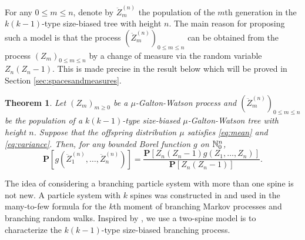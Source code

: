 \documentclass[12pt]{amsart}
\newtheorem{thm}{Theorem}[section]
\numberwithin{equation}{section}
\newcommand{\prob}{\mathbf P}
\newcommand{\expr}[1]{\left( #1 \right)}
\newcommand{\brac}[1]{\left[ #1 \right]}
\begin{document}
	For any $0\le m \le n$, denote by $\ddot Z_m^{(n)}$ the population of the $m$th generation in the $k(k-1)$-type size-biased tree with height $n$. 
	The main reason for proposing such a model is that the process $(\ddot Z_m^{(n)})_{0\le m\le n}$ can be obtained from the process $(Z_m)_{0\le m\le n}$ by a change of measure via the random variable $Z_n(Z_n-1)$. 
	This is made precise in the result below which will be proved in Section \ref{sec:spacesandmeasures}.
\begin{thm}
\label{thm:changeofmeasure}
	Let $(Z_m)_{m\ge 0}$ be a $\mu$-Galton-Watson process and 
	$(\ddot Z_m^{(n)})_{0\le m\le n}$ 
	be the population of a $k(k-1)$-type size-biased $\mu$-Galton-Watson tree with height $n$. 
	Suppose that the offspring distribution $\mu$ satisfies \eqref{eq:mean} and \eqref{eq:variance}. Then, for any bounded Borel function $g$ on $\mathbb N^{n}_0$,
\begin{equation*}
		\prob\brac{g\expr{\ddot Z_1^{(n)},\dots,\ddot Z_n^{(n)}}}
	=
		\frac{\prob\brac{Z_n(Z_n-1) g\expr{Z_1,\dots, Z_n}}}{\prob\brac{Z_n(Z_n-1)}}
		.
\end{equation*}
\end{thm}
\par
	The idea of considering a branching particle system with more than one spine is not new.
	A particle system with $k$ spines  was constructed in \cite{harris2015many} and used in the  many-to-few formula for the $k$th moment of branching Markov processes and branching random walks.
	Inspired by \cite{harris2015many}, we use a two-spine model is to characterize the $k(k-1)$-type size-biased branching process.
\end{document}
